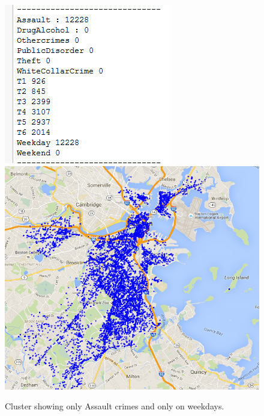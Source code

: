 \documentclass[journal, a4paper]{IEEEtran}
\begin{document}
    \begin{figure}[!hbt]
        \begin{center}
        \includegraphics[width=\columnwidth]{fig2.png}
        \includegraphics[width=\columnwidth]{fig3.png}
        \caption{Cluster showing only Assault crimes and only on weekdays.}
        \label{fig:tf_plot}
        \end{center}
    \end{figure}
\end{document}
